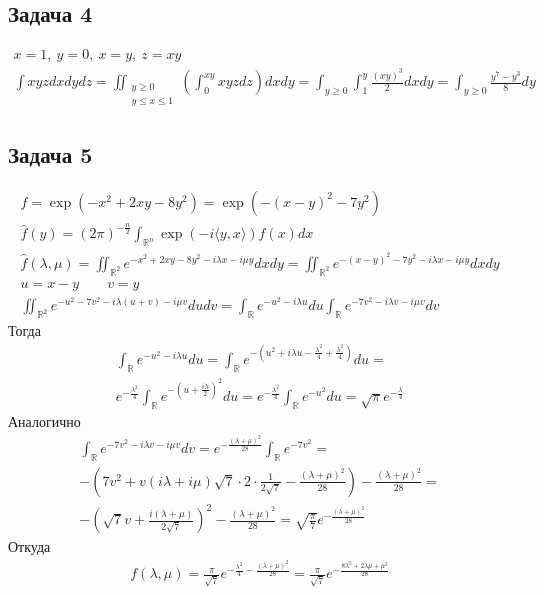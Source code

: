 \subsection*{Задача 4}
	\begin{gather*}
	x = 1,\ y = 0,\ x = y,\ z = xy\\
	\int xyz dxdydz = 
	\iint_{\substack{y \geqslant 0 \\ y \leqslant x \leqslant 1}} (\int_{0}^{xy} xyz dz) dxdy =
	\int_{y \geqslant 0} \int_{1}^{y} \frac{(xy)^3}{2} dxdy = \int_{y \geqslant 0} \frac{y^7 - y^3}{8}dy
	\end{gather*}
\vskip 0.4in


\subsection*{Задача 5}
	\begin{gather*}
	f = \operatorname{exp}(-x^2 + 2xy - 8y^2) = \operatorname{exp}(-(x-y)^2 - 7y^2)\\
	\hat{f}(y) = (2\pi)^{-\frac{n}{2}} \int_{\mathbb{R}^n} \operatorname{exp} (-i \langle y,x \rangle)f(x) dx\\
	\hat{f}(\lambda, \mu) = \iint_{\mathbb{R}^2} e^{-x^2 + 2xy - 8y^2 - i\lambda x - i\mu y} dxdy =
	\iint_{\mathbb{R}^2} e^{-(x-y)^2 - 7y^2 - i\lambda x - i\mu y} dxdy\\
	u = x-y\qquad v = y\\
	\iint_{\mathbb{R}^2} e^{-u^2 - 7v^2 - i\lambda(u+v) - i\mu v} du dv =
	\int_{\mathbb{R}} e^{-u^2-i \lambda u} du \int_{\mathbb{R}} e^{-7v^2 - i \lambda v - i \mu v} dv
	\end{gather*}
	Тогда
	\begin{gather*}
	\int_{\mathbb{R}} e^{-u^2 - i \lambda u} du = 
	\int_{\mathbb{R}} e^{-(u^2 + i \lambda u - \frac{\lambda^2}{4} + \frac{\lambda^2}{4})} du =\\
	e^{-\frac{\lambda^2}{4}} \int_{\mathbb{R}} e^{-\left(u + \frac{i \lambda}{2}\right)^2} du =
	e^{-\frac{\lambda^2}{4}} \int_{\mathbb{R}} e^{-u^2} du =
	\sqrt{\pi} e^{-\frac{\lambda}{4}}
	\end{gather*}
	Аналогично
	\begin{gather*}
	\int_{\mathbb{R}} e^{-7v^2 - i \lambda v - i \mu v} dv =
	e^{-\frac{(\lambda + \mu)^2}{28}} \int_{\mathbb{R}} e^{-7v^2} =\\
	-(7v^2 + v(i\lambda + i\mu)\sqrt{7} \cdot 2 \cdot \frac{1}{2\sqrt{7}} - \frac{(\lambda + \mu)^2}{28}) - \frac{(\lambda + \mu)^2}{28} =\\
	-\left(\sqrt{7}v + \frac{i(\lambda + \mu)}{2\sqrt{7}}\right)^2 - \frac{(\lambda + \mu)^2}{28} =
	\sqrt{\frac{\pi}{7}} e^{-\frac{(\lambda + \mu)^2}{28}}
	\end{gather*}
	Откуда
	\begin{gather*}
	f(\lambda, \mu) = \frac{\pi}{\sqrt{7}} e^{-\frac{\lambda^2}{4} - \frac{(\lambda+\mu)^2}{28}} =
	\frac{\pi}{\sqrt{7}} e^{-\frac{8\lambda^2 + 2\lambda \mu + \mu^2}{28}}
	\end{gather*}
\vskip 0.4in


